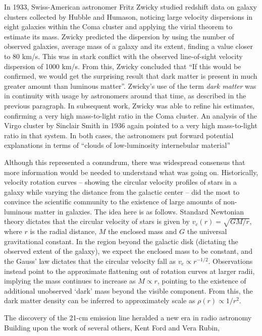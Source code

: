 In 1933, Swiss-American astronomer Fritz Zwicky studied redshift data on galaxy clusters collected by Hubble and Humason, noticing large velocity dispersions in eight galaxies within the Coma cluster and applying the virial theorem to estimate its mass. Zwicky predicted the dispersion by using the number of observed galaxies, average mass of a galaxy and its extent, finding a value closer to 80 km/s. This was in stark conflict with the observed line-of-sight velocity dispersion of 1000 km/s. From this, Zwicky concluded that ``If this would be confirmed, we would get the surprising result that dark matter is present in much greater amount than luminous matter''. Zwicky's use of the term \emph{dark matter} was in continuity with usage by astronomers around that time, as described in the previous paragraph. In subsequent work, Zwicky was able to refine his estimates, confirming a very high mass-to-light ratio in the Coma cluster. An analysis of the Virgo cluster by Sinclair Smith in 1936 again pointed to a very high mass-to-light ratio in that system. In both cases, the astronomers put forward potential explanations in terms of ``clouds of low-luminosity internebular material''

Although this represented a conundrum, there was widespread consensus that more information would be needed to understand what was going on. Historically, velocity rotation curves -- showing the circular velocity profiles of stars in a galaxy while varying the distance from the galactic center -- did the most to convince the scientific community to the existence of large amounts of non-luminous matter in galaxies. The idea here is as follows. Standard Newtonian theory dictates that the circular velocity of stars is given by $v_c(r) = \sqrt{GM/r}$, where $r$ is the radial distance, $M$ the enclosed mass and $G$ the universal gravitational constant. In the region beyond the galactic disk (dictating the observed extent of the galaxy), we expect the enclosed mass to be constant, and the Gauss' law dictates that the circular velocity fall as $v_c \propto r^{-1/2}$. Observations instead point to the approximate flattening out of rotation curves at larger radii, implying the mass continues to increase as $M \propto r$, pointing to the existence of additional unobserved `dark' mass beyond the visible component. From this, the dark matter density can be inferred to approximately scale as $\rho(r) \propto 1/r^2$.


The discovery of the 21-cm emission line heralded a new era in radio astronomy Building upon the work of several others, Kent Ford and Vera Rubin,

